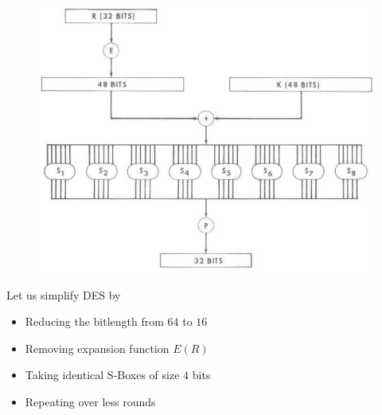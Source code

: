 \documentclass[9pt]{beamer}
\begin{document}
\begin{frame}
\begin{columns}
\begin{column}{0.6\textwidth}
\begin{figure}
\includegraphics[totalheight=0.5\textheight]{des_feistel.jpg}
\end{figure}
Let us simplify DES by
\begin{itemize}
\item{Reducing the bitlength from $64$ to $16$}
\item{Removing expansion function $E(R)$}
\item{Taking identical S-Boxes of size $4$ bits}
\item{Repeating over less rounds}
\end{itemize}
\end{column}


\end{columns}
\end{frame}
\end{document}
